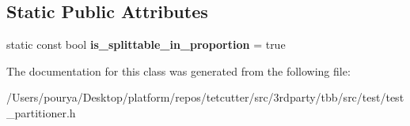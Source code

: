 \subsection*{Static Public Attributes}
\begin{DoxyCompactItemize}
\item 
\hypertarget{classtest__partitioner__utils_1_1interaction__with__range__and__partitioner_1_1Range1_a8019c932c1bce9e04234dd86a200119e}{}static const bool {\bfseries is\+\_\+splittable\+\_\+in\+\_\+proportion} = true\label{classtest__partitioner__utils_1_1interaction__with__range__and__partitioner_1_1Range1_a8019c932c1bce9e04234dd86a200119e}

\end{DoxyCompactItemize}


The documentation for this class was generated from the following file\+:\begin{DoxyCompactItemize}
\item 
/\+Users/pourya/\+Desktop/platform/repos/tetcutter/src/3rdparty/tbb/src/test/test\+\_\+partitioner.\+h\end{DoxyCompactItemize}
